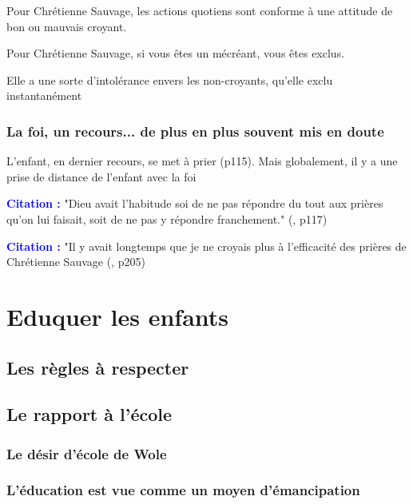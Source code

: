 \documentclass[a4paper, 11pt, hidelinks]{article}
\newcommand{\cit}{\large \textcolor{blue}{\textbf{Citation :}} \large }
\newcommand{\rb}[1]{\Romanbar{#1}}
\begin{document}
Pour Chrétienne Sauvage, les actions quotiens sont conforme à une attitude de bon ou mauvais croyant.


Pour Chrétienne Sauvage, si vous êtes un mécréant, vous êtes exclus.


Elle a une sorte d'intolérance envers les non-croyants, qu'elle exclu instantanément



\subsubsection{La foi, un recours... de plus en plus souvent mis en doute}

L'enfant, en dernier recours, se met à prier (p115). Mais globalement, il y a une prise de distance de l'enfant avec la foi

\cit "Dieu avait l'habitude soi de ne pas répondre du tout aux prières qu'on lui faisait, soit de ne pas y répondre franchement." (\rb{4}, p117)

\cit "Il y avait longtemps que je ne croyais plus à l'efficacité des prières de Chrétienne Sauvage (\rb{7}, p205)



\section{Eduquer les enfants}

\subsection{Les règles à respecter}





\subsection{Le rapport à l'école}

\subsubsection{Le désir d'école de Wole}




\subsubsection{L'éducation est vue comme un moyen d'émancipation}
\end{document}

